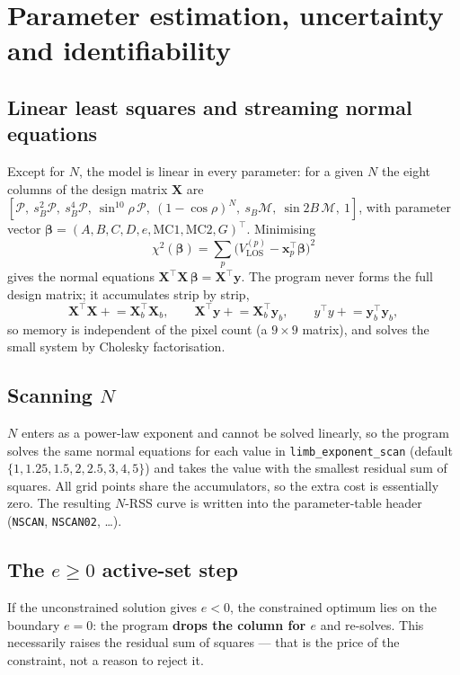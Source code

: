 \documentclass[11pt,a4paper]{article}
\newcommand{\code}[1]{\texttt{\small #1}}
\newcommand{\vlos}{V_{\mathrm{LOS}}}
\newcommand{\Proj}{\mathcal{P}}
\newcommand{\Merid}{\mathcal{M}}
\begin{document}
\section{Parameter estimation, uncertainty and identifiability}
\label{sec:estimation}

\subsection{Linear least squares and streaming normal equations}
Except for $N$, the model is linear in every parameter: for a given $N$ the
eight columns of the design matrix $\bm{X}$ are
$[\Proj,\ s_B^2\Proj,\ s_B^4\Proj,\ \sin^{10}\!\rho\,\Proj,\ (1-\cos\rho)^N,\
s_B\Merid,\ \sin2B\,\Merid,\ 1]$,
with parameter vector $\bm\beta = (A,B,C,D,e,\mathrm{MC1},\mathrm{MC2},G)^\top$.
Minimising
\begin{equation}
  \chi^2(\bm\beta) = \sum_{p}\bigl(\vlos^{(p)} - \bm{x}_p^\top\bm\beta\bigr)^2
\end{equation}
gives the normal equations $\bm{X}^\top\bm{X}\,\bm\beta = \bm{X}^\top\bm{y}$.
The program never forms the full design matrix; it accumulates strip by strip,
\begin{equation}
  \bm{X}^\top\bm{X} \mathrel{+}= \bm{X}_b^\top\bm{X}_b,\qquad
  \bm{X}^\top\bm{y} \mathrel{+}= \bm{X}_b^\top\bm{y}_b,\qquad
  y^\top y \mathrel{+}= \bm{y}_b^\top\bm{y}_b ,
\end{equation}
so memory is independent of the pixel count (a $9\times9$ matrix), and solves
the small system by Cholesky factorisation.

\subsection{Scanning $N$}
$N$ enters as a power-law exponent and cannot be solved linearly, so the program
solves the same normal equations for each value in
\code{limb\_exponent\_scan} (default $\{1,1.25,1.5,2,2.5,3,4,5\}$) and takes the
value with the smallest residual sum of squares.  All grid points share the
accumulators, so the extra cost is essentially zero.  The resulting $N$-RSS
curve is written into the parameter-table header (\code{NSCAN},
\code{NSCAN02}, \dots).

\subsection{The $e\ge0$ active-set step}
If the unconstrained solution gives $e<0$, the constrained optimum lies on the
boundary $e=0$: the program \textbf{drops the column for $e$} and re-solves.
This necessarily raises the residual sum of squares --- that is the price of the
constraint, not a reason to reject it.
\end{document}
